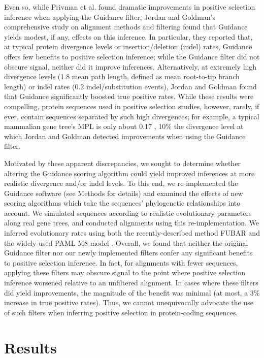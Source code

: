 \documentclass[12pt]{article}
\begin{document}
Even so, while Privman et al. \citep{Privman2012} found dramatic improvements in positive selection inference when applying the Guidance filter, Jordan and Goldman's \citep{Jordan2011} comprehensive study on alignment methods and filtering found that Guidance yields modest, if any, effects on this inference. In particular, they reported that, at typical protein divergence levels or insertion/deletion (indel) rates, Guidance offers few benefits to positive selection inference; while the Guidance filter did not obscure signal, neither did it improve inferences. Alternatively, at extremely high divergence levels (1.8 mean path length, defined as mean root-to-tip branch length) or indel rates (0.2 indel/substitution events), Jordan and Goldman found that Guidance significantly boosted true positive rates. While these results were compelling, protein sequences used in positive selection studies, however, rarely, if ever, contain sequences separated by such high divergences; for example, a typical mammalian gene tree's MPL is only about 0.17 \citep{Spielman2013}, 10\% the divergence level at which Jordan and Goldman detected improvements when using the Guidance filter.

Motivated by these apparent discrepancies, we sought to determine whether altering the Guidance scoring algorithm could yield improved inferences at more realistic divergence and/or indel levels. To this end, we re-implemented the Guidance software (see Methods for details) and examined the effects of new scoring algorithms which take the sequences' phylogenetic relationships into account. We simulated sequences according to realistic evolutionary parameters along real gene trees, and conducted alignments using this re-implementation. We inferred evolutionary rates using both the recently-described method FUBAR \citep{Murrell2013} and the widely-used PAML M8 model \citep{Yang2007}. Overall, we found that neither the original Guidance filter nor our newly implemented filters confer any significant benefits to positive selection inference. In fact, for alignments with fewer sequences, applying these filters may obscure signal to the point where positive selection inference worsened relative to an unfiltered alignment. In cases where these filters did yield improvements, the magnitude of the benefit was minimal (at most, a 3\% increase in true positive rates). Thus, we cannot unequivocally advocate the use of such filters when inferring positive selection in protein-coding sequences.


\section*{Results}
\end{document}
